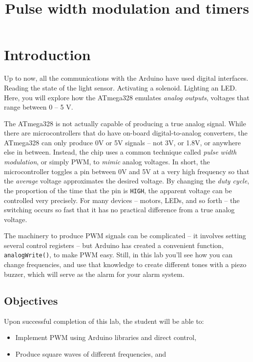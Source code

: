 \documentclass[11pt]{article} %
\title{Pulse width modulation and timers}
\author{}
\date{} %
\begin{document}
\maketitle


\section{Introduction}

Up to now, all the communications with the Arduino have used digital interfaces. Reading the state of the light sensor. Activating a solenoid. Lighting an LED. Here, you will explore how the ATmega328 emulates \emph{analog outputs}, voltages that range between 0 -- 5 V.

The ATmega328 is not actually capable of producing a true analog signal. While there are microcontrollers that do have on-board digital-to-analog converters, the ATmega328 can only produce 0V or 5V signals -- not 3V, or 1.8V, or anywhere else in between. Instead, the chip uses a common technique called \emph{pulse width modulation}, or simply PWM, to \emph{mimic} analog voltages. In short, the microcontroller toggles a pin between 0V and 5V at a very high frequency so that the \emph{average} voltage approximates the desired voltage. By changing the \emph{duty cycle}, the proportion of the time that the pin is \verb|HIGH|, the apparent voltage can be controlled very precisely. For many devices -- motors, LEDs, and so forth -- the switching occurs so fast that it has no practical difference from a true analog voltage.

The machinery to produce PWM signals can be complicated -- it involves setting several control registers -- but Arduino has created a convenient function, \verb|analogWrite()|, to make PWM easy. Still, in this lab you’ll see how you can change frequencies, and use that knowledge to create different tones with a piezo buzzer, which will serve as the alarm for your alarm system.

\subsection{Objectives}

Upon successful completion of this lab, the student will be able to:
\begin{itemize}
\item Implement PWM using Arduino libraries and direct control,
\item Produce square waves of different frequencies, and
\end{itemize}
\end{document}
